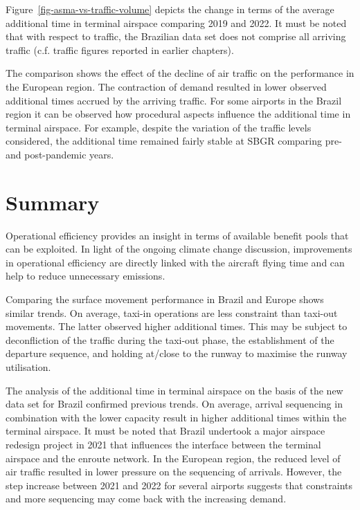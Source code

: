 \documentclass[
  a4paper,
  DIV=11,
  numbers=noendperiod]{scrreport}
\begin{document}
Figure~\ref{fig-asma-vs-traffic-volume} depicts the change in terms of
the average additional time in terminal airspace comparing 2019 and
2022. It must be noted that with respect to traffic, the Brazilian data
set does not comprise all arriving traffic (c.f. traffic figures
reported in earlier chapters).

The comparison shows the effect of the decline of air traffic on the
performance in the European region. The contraction of demand resulted
in lower observed additional times accrued by the arriving traffic. For
some airports in the Brazil region it can be observed how procedural
aspects influence the additional time in terminal airspace. For example,
despite the variation of the traffic levels considered, the additional
time remained fairly stable at SBGR comparing pre- and post-pandemic
years.

\hypertarget{summary-4}{%
\section{Summary}\label{summary-4}}

Operational efficiency provides an insight in terms of available benefit
pools that can be exploited. In light of the ongoing climate change
discussion, improvements in operational efficiency are directly linked
with the aircraft flying time and can help to reduce unnecessary
emissions.

Comparing the surface movement performance in Brazil and Europe shows
similar trends. On average, taxi-in operations are less constraint than
taxi-out movements. The latter observed higher additional times. This
may be subject to deconfliction of the traffic during the taxi-out
phase, the establishment of the departure sequence, and holding at/close
to the runway to maximise the runway utilisation.

The analysis of the additional time in terminal airspace on the basis of
the new data set for Brazil confirmed previous trends. On average,
arrival sequencing in combination with the lower capacity result in
higher additional times within the terminal airspace. It must be noted
that Brazil undertook a major airspace redesign project in 2021 that
influences the interface between the terminal airspace and the enroute
network. In the European region, the reduced level of air traffic
resulted in lower pressure on the sequencing of arrivals. However, the
step increase between 2021 and 2022 for several airports suggests that
constraints and more sequencing may come back with the increasing
demand.
\end{document}
